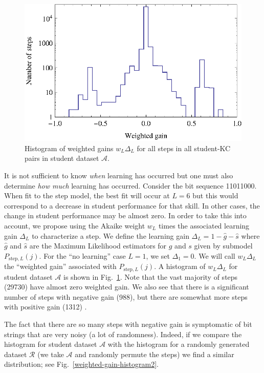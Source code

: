 \documentclass{acmlarge-edm}
\begin{document}
\begin{figure}
  \centering \includegraphics{weighted-gain-histogram.eps}
   \caption{Histogram of weighted gains $w_L \Delta_L$ for
     all steps in all student-KC pairs in student dataset $\mathcal{A}$.}
    \label{weighted-gain-histogram}
\end{figure}

It is not sufficient to know {\it when} learning has occurred but one
must also determine {\it how much} learning has occurred.  Consider
the bit sequence 11011000.  When fit to the step model, the best fit
will occur at $L=6$ but this would correspond to a decrease in student
performance for that skill.  In other cases, the change in student
performance may be almost zero.  In order to take this into account,
we propose using the Akaike weight $w_L$ times the associated learning
gain $\Delta_L$ to characterize a step.  We define the learning gain
$\Delta_L=1-\hat{g}-\hat{s}$ where $\hat{g}$ and $\hat{s}$ are the
Maximum Likelihood estimators for $g$ and $s$ given by submodel
$P_{\mathrm{step},L}(j)$.  For the ``no learning'' case $L=1$, we set
$\Delta_1=0$.  We will call $w_L \Delta_L$ the ``weighted gain''
associated with $P_{\mathrm{step},L}(j)$.  A histogram of $w_L
\Delta_L$ for student dataset $\mathcal{A}$ is shown in
Fig.~\ref{weighted-gain-histogram}.  Note that the vast majority of
steps (29730) have almost zero weighted gain.  We also see that there
is a significant number of steps with negative gain (988), but there
are somewhat more steps with positive gain (1312) .

The fact that there are so many steps with negative gain is
symptomatic of bit strings that are very noisy (a lot of
randomness).  Indeed, if we compare the histogram for student
dataset $\mathcal{A}$ with the histogram for a randomly 
generated dataset $\mathcal{R}$ (we take $\mathcal{A}$ and
randomly permute the steps) we find a similar distribution;
see Fig.~\ref{weighted-gain-histogram2}.
\end{document}
